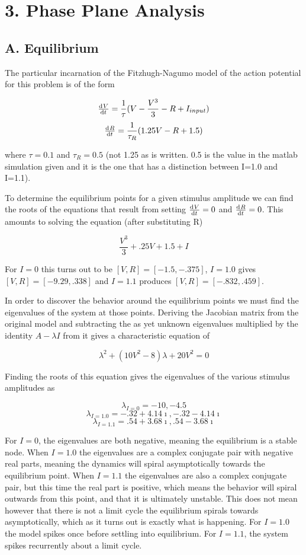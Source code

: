 \documentclass[12pt]{article}
\begin{document}
\section{3. Phase Plane Analysis}

\subsection{A. Equilibrium}

The particular incarnation of the Fitzhugh-Nagumo model of the action potential for this problem is of the form

$$ \od{V}{t}=\frac{1}{\tau}(V-\frac{V^3}{3}-R+I_{input}) $$
$$ \od{R}{t}=\frac{1}{\tau_R}(1.25V-R+1.5) $$

where $\tau=0.1$ and $\tau_R=0.5$ (not 1.25 as is written.  0.5 is the value in the matlab simulation given and it is the one that has a distinction between I=1.0 and I=1.1).  

To determine the equilibrium points for a given stimulus amplitude we can find the roots of the equations that result from setting $\od{V}{t}=0$ and $\od{R}{t}=0$.  This amounts to solving the equation (after substituting R)

$$ \frac{V^3}{3}+.25V+1.5+I $$

For $I=0$ this turns out to be $[V,R]=[-1.5,-.375]$, $I=1.0$ gives $[V,R]=[-9.29,.338]$ and $I=1.1$ produces $[V,R]=[-.832,.459]$.  

In order to discover the behavior around the equilibrium points we must find the eigenvalues of the system at those points.  Deriving the Jacobian matrix from the original model and subtracting the as yet unknown eigenvalues multiplied by the identity $A-\lambda I$ from it gives a characteristic equation of 

$$ \lambda^2+(10V^2-8)\lambda+20V^2=0 $$

Finding the roots of this equation gives the eigenvalues of the various stimulus amplitudes as

$$ \lambda_{I=0}=-10,-4.5 $$
$$ \lambda_{I=1.0}=-.32+4.14\imath,-.32-4.14\imath $$
$$ \lambda_{I=1.1}=.54+3.68\imath,.54-3.68\imath $$

For $I=0$, the eigenvalues are both negative, meaning the equilibrium is a stable node.  When $I=1.0$ the eigenvalues are a complex conjugate pair with negative real parts, meaning the dynamics will spiral asymptotically towards the equilibrium point.  When $I=1.1$ the eigenvalues are also a complex conjugate pair, but this time the real part is positive, which means the behavior will spiral outwards from this point, and that it is ultimately unstable.  This does not mean however that there is not a limit cycle the equilibrium spirals towards asymptotically, which as it turns out is exactly what is happening.  For $I=1.0$ the model spikes once before settling into equilibrium.  For $I=1.1$, the system spikes recurrently about a limit cycle.
\end{document}
